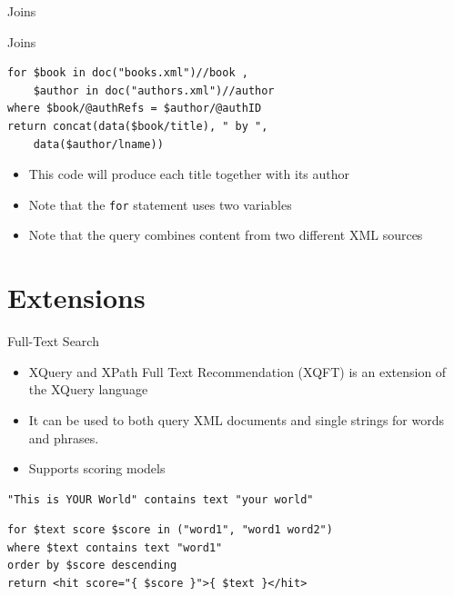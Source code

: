 \documentclass[svgnames]{beamer}
\begin{document}
\begin{frame}[fragile]{Joins}
\small
\begin{block}{Joins}
\begin{verbatim}
for $book in doc("books.xml")//book ,
    $author in doc("authors.xml")//author
where $book/@authRefs = $author/@authID
return concat(data($book/title), " by ", 
    data($author/lname))
\end{verbatim}
\end{block}
\normalsize
\begin{itemize}
	\item This code will produce each title together with its author
	\item Note that the \texttt{for} statement uses two variables
	\item Note that the query combines content from two different XML sources
\end{itemize}
\end{frame}



\section{Extensions}

\begin{frame}[fragile]{Full-Text Search}
\begin{itemize}
\item XQuery and XPath Full Text Recommendation (XQFT) is an extension of the XQuery language
\item It can be used to both query XML documents and single strings for words and phrases.
\item Supports scoring models
\end{itemize}

\begin{block}{}
\begin{verbatim}
"This is YOUR World" contains text "your world"
\end{verbatim}
\end{block}

\begin{block}{}
\begin{verbatim}
for $text score $score in ("word1", "word1 word2")
where $text contains text "word1"
order by $score descending
return <hit score="{ $score }">{ $text }</hit>
\end{verbatim}
\end{block}

\end{frame}
\end{document}

